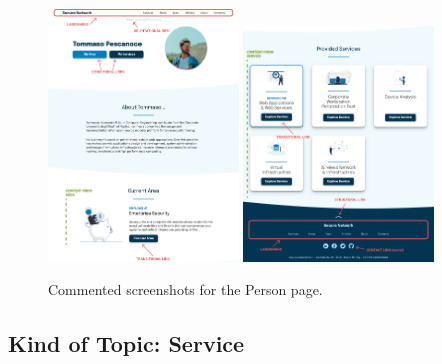 \documentclass[12pt]{report}
\begin{document}
\begin{figure}[H]
	\centering
	\includegraphics[width=0.45\textwidth]{high_fid_wireframes/person/1.png}
	\includegraphics[width=0.45\textwidth]{high_fid_wireframes/person/2.png}
	\caption{Commented screenshots for the Person page.}
\end{figure}

\subsection{Kind of Topic: Service}
\end{document}
